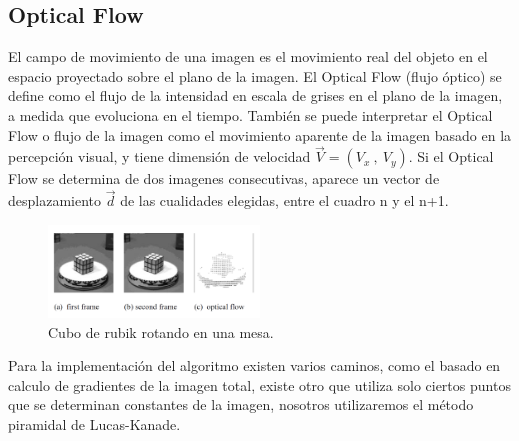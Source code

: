 \subsection{Optical Flow} 
El campo de movimiento de una imagen es el movimiento real del objeto en el espacio proyectado sobre el plano de la imagen. El Optical Flow (flujo óptico) se define como el flujo de la intensidad en escala de grises en el plano de la imagen, a medida que evoluciona en el tiempo. También se puede interpretar el Optical Flow o flujo de la imagen como el movimiento aparente de la imagen  basado en la percepción visual, y tiene dimensión de velocidad $\vec{V}= (V_x \ , \ V_y)$. Si el Optical Flow se determina de dos imagenes consecutivas, aparece un vector de desplazamiento $\vec{d}$ de las cualidades elegidas, entre el cuadro n y el n+1.
\begin{figure}[H]
		\centering
		\includegraphics[width=0.5\textwidth]{Imagenes/opticalflowrubick.png}
		\caption{Cubo de rubik rotando en una mesa.}
		\label{fig:opticalflow1}
\end{figure}
Para la implementación del algoritmo existen varios caminos, como el basado en calculo de gradientes de la imagen total, existe otro que utiliza solo ciertos puntos que se determinan constantes de la imagen, nosotros utilizaremos el método piramidal de Lucas-Kanade.

